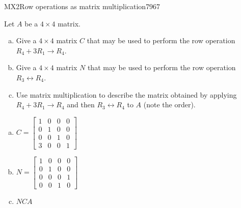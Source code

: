 \begin{exercise}{MX2}{Row operations as matrix multiplication}{7967} 
\begin{exerciseStatement} 

Let \(A\) be a \(4 \times 4\) matrix.

 

\begin{enumerate}[(a)]
\item Give a \(4 \times 4\) matrix \(C\) that may be used to perform the row operation \(R_4 + 3 R_1 \to R_4\).
\item Give a \(4 \times 4\) matrix \(N\) that may be used to perform the row operation \(R_3 \leftrightarrow R_4\).
\item Use matrix multiplication to describe the matrix obtained by applying \(R_4 + 3 R_1 \to R_4\) and then \(R_3 \leftrightarrow R_4\) to \(A\) (note the order). 
\end{enumerate}

     \end{exerciseStatement}
 \begin{exerciseAnswer} 

\begin{enumerate}[(a)]
\item \(C=\left[\begin{array}{cccc}
1 & 0 & 0 & 0 \\
0 & 1 & 0 & 0 \\
0 & 0 & 1 & 0 \\
3 & 0 & 0 & 1
\end{array}\right]\)
\item \(N=\left[\begin{array}{cccc}
1 & 0 & 0 & 0 \\
0 & 1 & 0 & 0 \\
0 & 0 & 0 & 1 \\
0 & 0 & 1 & 0
\end{array}\right]\)
\item  \(NCA\) 
\end{enumerate}

     \end{exerciseAnswer}
 \end{exercise}


